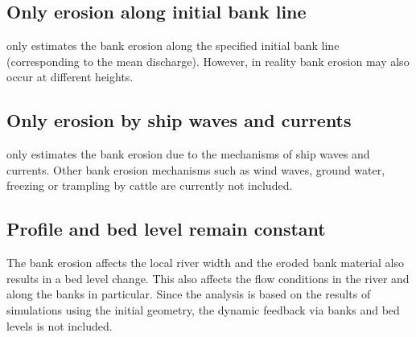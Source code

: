 \subsection{Only erosion along initial bank line}

\dfastbe only estimates the bank erosion along the specified initial bank line (corresponding to the mean discharge).
However, in reality bank erosion may also occur at different heights.

\subsection{Only erosion by ship waves and currents}

\dfastbe only estimates the bank erosion due to the mechanisms of ship waves and currents.
Other bank erosion mechanisms such as wind waves, ground water, freezing or trampling by cattle are currently not included.

\subsection{Profile and bed level remain constant}

The bank erosion affects the local river width and the eroded bank material also results in a bed level change.
This also affects the flow conditions in the river and along the banks in particular.
Since the analysis is based on the results of \dflowfm simulations using the initial geometry, the dynamic feedback via banks and bed levels is not included.
